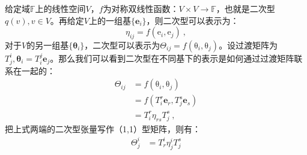 

给定域$\mathbb F$上的线性空间$V$，$f$为对称双线性函数：$V\times V\to \mathbb F$，也就是二次型$q(v),v\in V$。再给定$V$上的一组基$\{\boldsymbol e_i\}$，则二次型可以表示为：
\begin{equation}
\eta_{ij}=f(\boldsymbol {\mathrm e}_i,\boldsymbol {\mathrm e}_j)~,
\end{equation}
对于$V$的另一组基$\{\boldsymbol \theta_i\}$，二次型可以表示为$\Theta_{ij}=f(\boldsymbol {\mathrm \theta}_{i},\boldsymbol {\mathrm \theta}_{j})$。设过渡矩阵为$T^i_j,\boldsymbol {\theta}_i=T^j_i\boldsymbol e_j$。那么我们可以看到二次型在不同基下的表示是如何通过过渡矩阵联系在一起的：
\begin{equation}
\begin{aligned}
\Theta_{ij}&=f(\boldsymbol {\mathrm \theta}_{i},\boldsymbol {\mathrm \theta}_{j})\\
&=f(T^r_i\boldsymbol e_r,T^s_j\boldsymbol e_s)\\
&=T^r_i \eta_{rs}T^s_j~,
\end{aligned}
\end{equation}
把上式两端的二次型张量写作（1,1）型矩阵，则有：
\begin{equation}
\begin{aligned}
\Theta^i_j&=T^i_r\eta^i_jT^s_j\\

\end{aligned}
\end{equation}